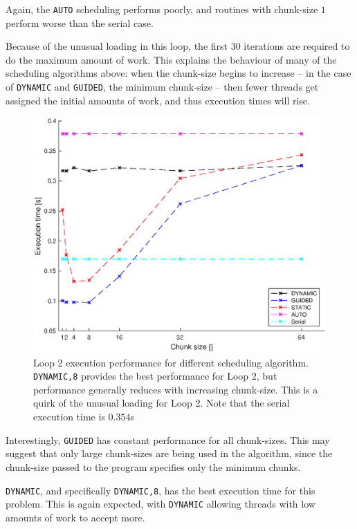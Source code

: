 \documentclass{article} %
\newcommand{\tp}{\texttt}
\begin{document}
Again, the \tp{AUTO} scheduling performs poorly, and routines with chunk-size $1$ perform worse than the serial case.

Because of the unusual loading in this loop, the first 30 iterations are required to do the maximum amount of work.
This explains the behaviour of many of the scheduling algorithms above: when the chunk-size begins to increase -- in the case of \tp{DYNAMIC} and \tp{GUIDED}, the minimum chunk-size -- then fewer threads get assigned the initial amounts of work, and thus execution times will rise.

\begin{figure}
    \centering
    \includegraphics[height=.35\textheight]{part1_plots/all_part2.eps}
    \caption{Loop 2 execution performance for different scheduling algorithm. \tp{DYNAMIC,8} provides the best performance for Loop 2, but performance generally reduces with increasing chunk-size.
    This is a quirk of the unusual loading for Loop 2. Note that the serial execution time is $0.354$s}
    \label{fig:loop2results}
\end{figure}

Interestingly, \tp{GUIDED} has constant performance for all chunk-sizes.
This may suggest that only large chunk-sizes are being used in the algorithm, since the chunk-size passed to the program specifies only the minimum chunks. 

\tp{DYNAMIC}, and specifically \tp{DYNAMIC,8}, has the best execution time for this problem. This is again expected, with \tp{DYNAMIC} allowing threads with low amounts of work to accept more.
\end{document}
